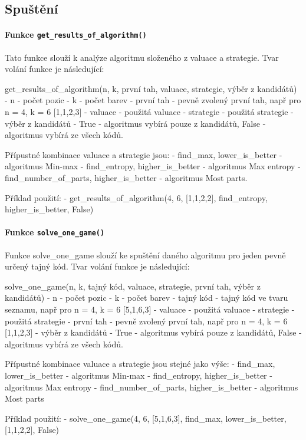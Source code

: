\documentclass[12pt,a4paper]{article}
\begin{document}
\subsection{Spuštění}


\paragraph{Funkce \texttt{get\_results\_of\_algorithm()}}
Tato funkce slouží k analýze algoritmu složeného z valuace a strategie. Tvar volání funkce je následující:

get_results_of_algorithm(n, k, první tah, valuace, strategie, výběr z kandidátů)
- n - počet pozic
- k - počet barev
- první tah - pevně zvolený první tah, např pro n = 4, k = 6 [1,1,2,3]
- valuace - použitá valuace
- strategie - použitá strategie
- výběr z kandidátů - True - algoritmus vybírá pouze z kandidátů, False - algoritmus vybírá ze všech kódů.


Přípustné kombinace valuace a strategie jsou:
- find_max, lower_is_better - algoritmus Min-max
- find_entropy, higher_is_better - algoritmus Max entropy
- find_number_of_parts, higher_is_better - algoritmus Most parts.

Příklad použití:
- get_results_of_algorithm(4, 6, [1,1,2,2], find_entropy, higher_is_better, False)

\paragraph{Funkce \texttt{solve\_one\_game()}}
Funkce solve_one_game slouží ke spuštění daného algoritmu pro jeden pevně určený tajný kód. Tvar volání funkce je následující:

solve_one_game(n, k, tajný kód, valuace, strategie, první tah, výběr z kandidátů)
- n - počet pozic
- k - počet barev
- tajný kód - tajný kód ve tvaru seznamu, např pro n = 4, k = 6 [5,1,6,3]
- valuace - použitá valuace
- strategie - použitá strategie
- první tah - pevně zvolený první tah, např pro n = 4, k = 6 [1,1,2,3]
- výběr z kandidátů - True - algoritmus vybírá pouze z kandidátů, False - algoritmus vybírá ze všech kódů.

Přípustné kombinace valuace a strategie jsou stejné jako výše:
- find_max, lower_is_better - algoritmus Min-max
- find_entropy, higher_is_better - algoritmus Max entropy
- find_number_of_parts, higher_is_better - algoritmus Most parts

Příklad použití:
- solve_one_game(4, 6, [5,1,6,3], find_max, lower_is_better, [1,1,2,2], False)
\end{document}
